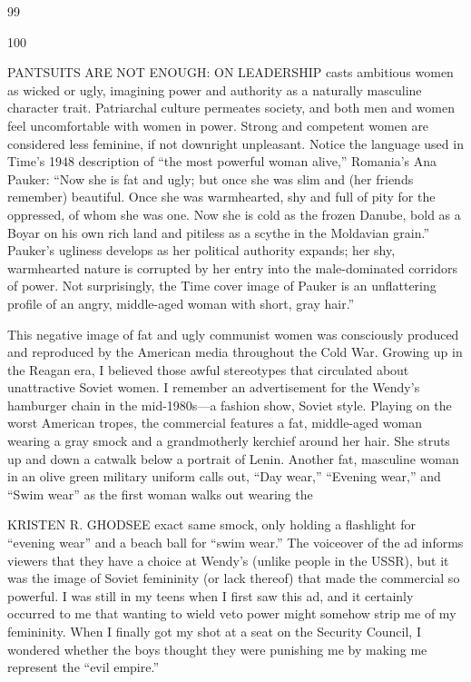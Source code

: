  \par 
99
 \par 
100
 \par 
PANTSUITS ARE NOT ENOUGH: ON LEADERSHIP casts ambitious women as wicked or ugly, imagining power and authority as a naturally masculine character trait. Patriarchal culture permeates society, and both men and women feel uncomfortable with women in power. Strong and competent women are considered less feminine, if not downright unpleasant. Notice the language used in Time's 1948 description of “the most powerful woman alive,” Romania’s Ana Pauker: “Now she is fat and ugly; but once she was slim and (her friends remember) beautiful. Once she was warmhearted, shy and full of pity for the oppressed, of whom she was one. Now she is cold as the frozen Danube, bold as a Boyar on his own rich land and pitiless as a scythe in the Moldavian grain.” Pauker’s ugliness develops as her political authority expands; her shy, warmhearted nature is corrupted by her entry into the male-dominated corridors of power. Not surprisingly, the Time cover image of Pauker is an unflattering profile of an angry, middle-aged woman with short, gray hair.”
 \par 
This negative image of fat and ugly communist women was consciously produced and reproduced by the American media throughout the Cold War. Growing up in the Reagan era, I believed those awful stereotypes that circulated about unattractive Soviet women. I remember an advertisement for the Wendy’s hamburger chain in the mid-1980s—a fashion show, Soviet style. Playing on the worst American tropes, the commercial features a fat, middle-aged woman wearing a gray smock and a grandmotherly kerchief around her hair. She struts up and down a catwalk below a portrait of Lenin. Another fat, masculine woman in an olive green military uniform calls out, “Day wear,” “Evening wear,” and “Swim wear” as the first woman walks out wearing the
 \par 
KRISTEN R. GHODSEE exact same smock, only holding a flashlight for “evening wear” and a beach ball for “swim wear.” The voiceover of the ad informs viewers that they have a choice at Wendy’s (unlike people in the USSR), but it was the image of Soviet femininity (or lack thereof) that made the commercial so powerful. I was still in my teens when I first saw this ad, and it certainly occurred to me that wanting to wield veto power might somehow strip me of my femininity. When I finally got my shot at a seat on the Security Council, I wondered whether the boys thought they were punishing me by making me represent the “evil empire.”
